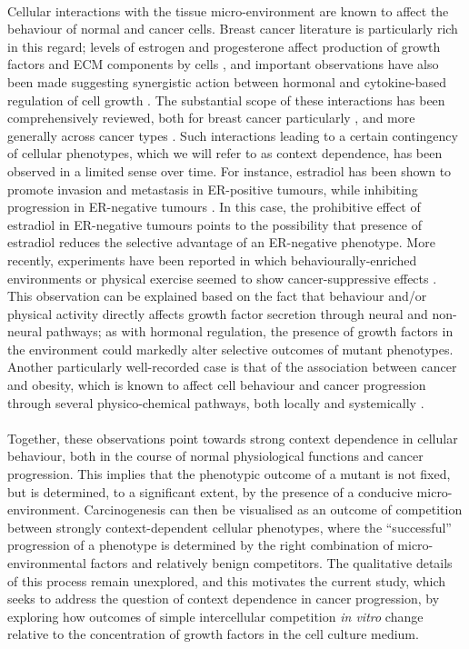 \documentclass[12pt, letterpaper, onecolumn]{article}
\begin{document}
	\paragraph{\empty}Cellular interactions with the tissue micro-environment are known to affect the behaviour of normal and cancer cells. Breast cancer literature is particularly rich in this regard; levels of estrogen and progesterone affect production of growth factors and ECM components by cells \cite{Haslam2001,Woodward2000,DICKSON1987}, and important observations have also been made suggesting synergistic action between hormonal and cytokine-based regulation of cell growth \cite{Freund2003}. The substantial scope of these interactions has been comprehensively reviewed, both for breast cancer particularly \cite{Hansen2000}, and more generally across cancer types \cite{Pietras2010,Hanahan2012,Cabarcas2011a}. Such interactions leading to a certain contingency of cellular phenotypes, which we will refer to as context dependence, has been observed in a limited sense over time. For instance, estradiol has been shown to promote invasion and metastasis in ER-positive tumours, while inhibiting progression in ER-negative tumours \cite{Garcia1992}. In this case, the prohibitive effect of estradiol in ER-negative tumours points to the possibility that presence of estradiol reduces the selective advantage of an ER-negative phenotype. More recently, experiments have been reported in which behaviourally-enriched environments or physical exercise seemed to show cancer-suppressive effects \cite{Cao2010,Rundqvist2013}. This observation can be explained based on the fact that behaviour and/or physical activity directly affects growth factor secretion through neural and non-neural pathways; as with hormonal regulation, the presence of growth factors in the environment could markedly alter selective outcomes of mutant phenotypes. Another particularly well-recorded case is that of the association between cancer and obesity, which is known to affect cell behaviour and cancer progression through several physico-chemical pathways, both locally and systemically \cite{Druso2018,Iyengar2016}.  
	
	\paragraph{\empty}Together, these observations point towards strong context dependence in cellular behaviour, both in the course of normal physiological functions and cancer progression. This implies that the phenotypic outcome of a mutant is not fixed, but is determined, to a significant extent, by the presence of a conducive micro-environment. Carcinogenesis can then be visualised as an outcome of competition between strongly context-dependent cellular phenotypes, where the ``successful'' progression of a phenotype is determined by the right combination of micro-environmental factors and relatively benign competitors. The qualitative details of this process remain unexplored, and this motivates the current study, which seeks to address the question of context dependence in cancer progression, by exploring how outcomes of simple intercellular competition \textit{in vitro} change relative to the concentration of growth factors in the cell culture medium. 
	
\end{document}
